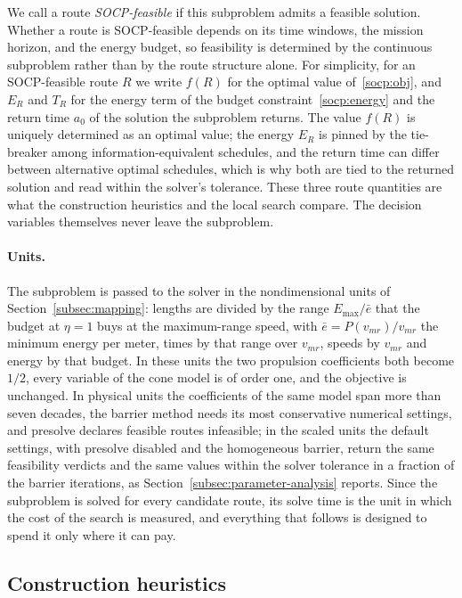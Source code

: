 \documentclass[11pt]{article}
\let\originalsubsection\subsection
\renewcommand{\subsection}{\FloatBarrier\originalsubsection}
\begin{document}
We call a route \emph{SOCP-feasible} if this subproblem admits a feasible solution. Whether a route is SOCP-feasible depends on its time windows, the mission horizon, and the energy budget, so feasibility is determined by the continuous subproblem rather than by the route structure alone. For simplicity, for an SOCP-feasible route $R$ we write $f(R)$ for the optimal value of~\eqref{socp:obj}, and $E_R$ and $T_R$ for the energy term of the budget constraint~\eqref{socp:energy} and the return time $a_0$ of the solution the subproblem returns. The value $f(R)$ is uniquely determined as an optimal value; the energy $E_R$ is pinned by the tie-breaker among information-equivalent schedules, and the return time can differ between alternative optimal schedules, which is why both are tied to the returned solution and read within the solver's tolerance. These three route quantities are what the construction heuristics and the local search compare. The decision variables themselves never leave the subproblem.

\paragraph{Units.}
The subproblem is passed to the solver in the nondimensional units of Section~\ref{subsec:mapping}: lengths are divided by the range $E_{\max}/\bar{e}$ that the budget at $\eta = 1$ buys at the maximum-range speed, with $\bar{e} = P(v_{mr})/v_{mr}$ the minimum energy per meter, times by that range over $v_{mr}$, speeds by $v_{mr}$ and energy by that budget. In these units the two propulsion coefficients both become $1/2$, every variable of the cone model is of order one, and the objective is unchanged. In physical units the coefficients of the same model span more than seven decades, the barrier method needs its most conservative numerical settings, and presolve declares feasible routes infeasible; in the scaled units the default settings, with presolve disabled and the homogeneous barrier, return the same feasibility verdicts and the same values within the solver tolerance in a fraction of the barrier iterations, as Section~\ref{subsec:parameter-analysis} reports. Since the subproblem is solved for every candidate route, its solve time is the unit in which the cost of the search is measured, and everything that follows is designed to spend it only where it can pay.

\subsection{Construction heuristics}\label{subsec:initial}
\end{document}

